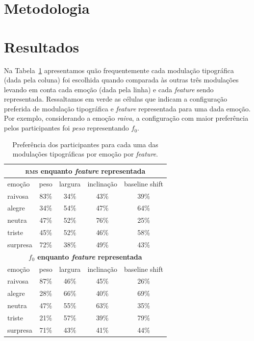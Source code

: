 \documentclass[11pt]{article}
\begin{document}
  \section{Metodologia}
  \label{sec:metodologia}
  
  
  


\section{Resultados}
  \label{sec:resultados}
  
  Na Tabela~\ref{tab:type_perf} apresentamos quão frequentemente cada modulação tipográfica (dada pela coluna) foi escolhida quando comparada às outras três modulações levando em conta cada emoção (dada pela linha) e cada {\itshape feature} sendo representada. Ressaltamos em verde as células que indicam a configuração preferida de modulação tipográfica e {\itshape feature} representada para uma dada emoção. Por exemplo, considerando a emoção {\itshape raiva}, a configuração com maior preferência pelos participantes foi {\itshape peso} representando $f_0$.
  
\begin{table}
    \begin{tabular*}{\linewidth}{lcccc}
        \toprule
        \multicolumn{5}{c}{ \textbf{\textsc{rms} enquanto {\itshape feature} representada} }     \\
        \midrule
        emoção & peso & largura & inclinação & baseline shift  \\
        \midrule
        raivosa       & 83\% & 34\% & 43\% & 39\% \\
        alegre        & 34\% & 54\% & 47\% & 64\% \\
        neutra        & 47\% & 52\% & \cellcolor[HTML]{9ef7cd}76\% & 25\% \\
        triste        & 45\% & 52\% & 46\% & 58\% \\
        surpresa      & \cellcolor[HTML]{9ef7cd}72\% & 38\% & 49\% & 43\% \\
        \midrule
        \multicolumn{5}{c}{ \textbf{$f_0$ enquanto {\itshape feature} representada} }      \\
        \midrule
        emoção & peso & largura & inclinação & baseline shift  \\
        \midrule
        raivosa       & \cellcolor[HTML]{9ef7cd}87\% & 46\% & 45\% & 26\% \\
        alegre        & 28\% & 66\% & 40\% & \cellcolor[HTML]{9ef7cd}69\% \\
        neutra        & 47\% & 55\% & 63\% & 35\% \\
        triste        & 21\% & 57\% & 39\% & \cellcolor[HTML]{9ef7cd}79\% \\
        surpresa      & 71\% & 43\% & 41\% & 44\% \\
        \bottomrule
    \end{tabular*}
    \caption{Preferência dos participantes para cada uma das modulações tipográficas por emoção por {\itshape feature}. }
    \label{tab:type_perf}
\end{table}
  
\end{document}
